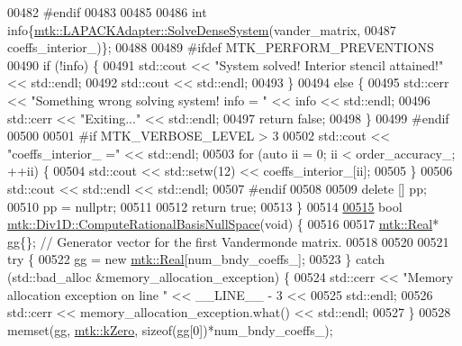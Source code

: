 \begin{DoxyCode}
{{00482 \textcolor{preprocessor}{  #endif}
00483 
00485 
00486   \textcolor{keywordtype}{int} info\{\hyperlink{classmtk_1_1LAPACKAdapter_a7428bccf74fd4a4af68fb7233846da22}{mtk::LAPACKAdapter::SolveDenseSystem}(vander\_matrix,
00487                                                 coeffs\_interior\_)\};
00488 
00489 \textcolor{preprocessor}{  #ifdef MTK\_PERFORM\_PREVENTIONS}
00490   \textcolor{keywordflow}{if} (!info) \{
00491     std::cout << \textcolor{stringliteral}{"System solved! Interior stencil attained!"} << std::endl;
00492     std::cout << std::endl;
00493   \}
00494   \textcolor{keywordflow}{else} \{
00495     std::cerr << \textcolor{stringliteral}{"Something wrong solving system! info = "} << info << std::endl;
00496     std::cerr << \textcolor{stringliteral}{"Exiting..."} << std::endl;
00497     \textcolor{keywordflow}{return} \textcolor{keyword}{false};
00498   \}
00499 \textcolor{preprocessor}{  #endif}
00500 
00501 \textcolor{preprocessor}{  #if MTK\_VERBOSE\_LEVEL > 3}
00502   std::cout << \textcolor{stringliteral}{"coeffs\_interior\_ ="} << std::endl;
00503   \textcolor{keywordflow}{for} (\textcolor{keyword}{auto} ii = 0; ii < order\_accuracy\_; ++ii) \{
00504     std::cout << std::setw(12) << coeffs\_interior\_[ii];
00505   \}
00506   std::cout << std::endl << std::endl;
00507 \textcolor{preprocessor}{  #endif}
00508 
00509   \textcolor{keyword}{delete} [] pp;
00510   pp = \textcolor{keyword}{nullptr};
00511 
00512   \textcolor{keywordflow}{return} \textcolor{keyword}{true};
00513 \}
00514 
\hypertarget{mtk__div__1d_8cc_source_l00515}{}\hyperlink{classmtk_1_1Div1D_aa0c0c278b2c00a29c1ceaa70d31aebab}{00515} \textcolor{keywordtype}{bool} \hyperlink{classmtk_1_1Div1D_aa0c0c278b2c00a29c1ceaa70d31aebab}{mtk::Div1D::ComputeRationalBasisNullSpace}(\textcolor{keywordtype}{void}) \{
00516 
00517   \hyperlink{group__c01-roots_gac080bbbf5cbb5502c9f00405f894857d}{mtk::Real}* gg\{\}; \textcolor{comment}{// Generator vector for the first Vandermonde matrix.}
00518 
00520 
00521   \textcolor{keywordflow}{try} \{
00522     gg = \textcolor{keyword}{new} \hyperlink{group__c01-roots_gac080bbbf5cbb5502c9f00405f894857d}{mtk::Real}[num\_bndy\_coeffs\_];
00523   \} \textcolor{keywordflow}{catch} (std::bad\_alloc &memory\_allocation\_exception) \{
00524     std::cerr << \textcolor{stringliteral}{"Memory allocation exception on line "} << \_\_LINE\_\_ - 3 <<
00525       std::endl;
00526     std::cerr << memory\_allocation\_exception.what() << std::endl;
00527   \}
00528   memset(gg, \hyperlink{group__c01-roots_ga59a451a5fae30d59649bcda274fea271}{mtk::kZero}, \textcolor{keyword}{sizeof}(gg[0])*num\_bndy\_coeffs\_);
}}
\end{DoxyCode}
